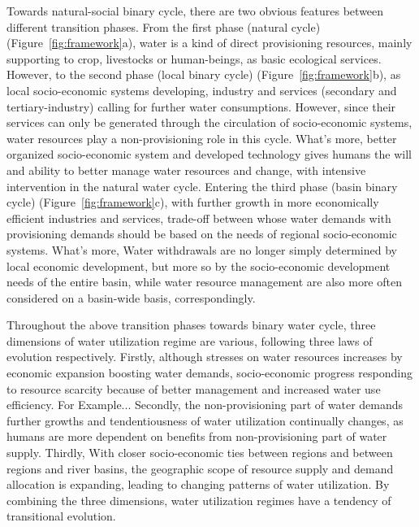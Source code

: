 \documentclass[9pt, twocolumn, twoside, lineno]{pnas-new}
\begin{document}
Towards natural-social binary cycle, there are two obvious features between different transition phases.
From the first phase (natural cycle) (Figure~\ref{fig:framework}a), 
water is a kind of direct provisioning resources, mainly supporting to crop, livestocks or human-beings, 
as basic ecological services.
However, to the second phase (local binary cycle) (Figure~\ref{fig:framework}b), 
as local socio-economic systems developing, 
industry and services (secondary and tertiary-industry) calling for further water consumptions.
However, since their services can only be generated through the circulation of socio-economic systems, 
water resources play a non-provisioning role in this cycle. 
What's more, better organized socio-economic system and developed technology 
gives humans the will and ability to better manage water resources and change, 
with intensive intervention in the natural water cycle. 
Entering the third phase (basin binary cycle) (Figure~\ref{fig:framework}c), 
with further growth in more economically efficient industries and services, 
trade-off between whose water demands with provisioning demands 
should be based on the needs of regional socio-economic systems.
What's more, Water withdrawals are no longer simply determined by local economic development, 
but more so by the socio-economic development needs of the entire basin, 
while water resource management are also more often considered on a basin-wide basis, correspondingly. 


Throughout the above transition phases towards binary water cycle, 
three dimensions of water utilization regime are various, following three laws of evolution respectively.
Firstly, although stresses on water resources increases by economic expansion boosting water demands, 
socio-economic progress responding to resource scarcity because of better management and increased water use efficiency. 
For Example...
Secondly, the non-provisioning part of water demands further growths and 
tendentiousness of water utilization continually changes, 
as humans are more dependent on benefits from non-provisioning part of water supply.
Thirdly, With closer socio-economic ties between regions and between regions and river basins, 
the geographic scope of resource supply and demand allocation is expanding, 
leading to changing patterns of water utilization.
By combining the three dimensions, water utilization regimes have a tendency of transitional evolution.
\end{document}
